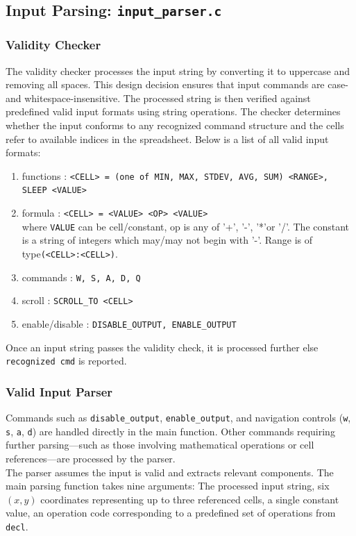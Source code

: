 \documentclass{report}
\begin{document}
\subsection*{Input Parsing: \texttt{input\_parser.c}}
\subsubsection*{Validity Checker}
The validity checker processes the input string by converting it to uppercase and removing all spaces. This design decision ensures that input commands are case- and whitespace-insensitive. The processed string is then verified against predefined valid input formats using string operations. The checker determines whether the input conforms to any recognized command structure and the cells refer to available indices in the spreadsheet. Below is a list of all valid input formats:
\begin{enumerate}
    \item functions : \texttt{<CELL> = (one of MIN, MAX, STDEV, AVG, SUM) <RANGE>, SLEEP <VALUE>}
    \item formula : \texttt{<CELL> = <VALUE> <OP> <VALUE>}\\
    where \texttt{VALUE} can be cell/constant, op is any of '+', '-', '*'or '/'. The constant is a string of integers which may/may not begin with '-'. Range is of type\texttt{(<CELL>:<CELL>)}.
    \item commands : \texttt{W, S, A, D, Q}
    \item scroll : \texttt{SCROLL\_TO <CELL>}
    \item enable/disable : \texttt{DISABLE\_OUTPUT, ENABLE\_OUTPUT}
\end{enumerate}
Once an input string passes the validity check, it is processed further else \texttt{recognized cmd} is reported.\\



\subsubsection*{Valid Input Parser}
Commands such as \texttt{disable\_output}, \texttt{enable\_output}, and navigation controls (\texttt{w}, \texttt{s}, \texttt{a}, \texttt{d}) are handled directly in the main function. Other commands requiring further parsing—such as those involving mathematical operations or cell references—are processed by the parser.\\
 The parser assumes the input is valid and extracts relevant components. The main parsing function takes nine arguments: The processed input string, six \((x, y)\) coordinates representing up to three referenced cells, a single constant value, an operation code corresponding to a predefined set of operations from \texttt{decl}.
\end{document}
